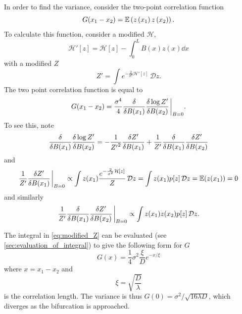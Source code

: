 In order to find the variance, consider the two-point correlation function
\begin{equation}
  \label{eq:two_point_corr}
  G(x_1 - x_2) = \operatorname*{\mathbb{E}} \left(z\left(x_1\right)z\left(x_2\right)\right).
\end{equation}
To calculate this function, consider a modified $\mathcal{H}$,
\begin{equation}
  \label{eq:modified_H}
  \mathcal{H}'[z] = \mathcal{H}[z] - \int_0^L B(x) z(x) \dd{x}
\end{equation}
with a modified $Z$
\begin{equation}
  \label{eq:modified_Z}
  Z' = \int e^{-\frac{2}{\sigma^2} \mathcal{H}'[z]}\,\mathcal{D}z.
\end{equation}
The two point correlation function is equal \parencite{Goldenfeld1992} to
\begin{equation}
  \label{eq:two_point_from_partition}
  G(x_1-x_2) = \frac{\sigma^4}{4}\fdv{B(x_1)}\fdv{\log Z'}{B(x_2)} \eval_{B=0}.
\end{equation}
To see this, note
\begin{equation}
  \label{eq:log_deriv}
  \fdv{B(x_1)}\fdv{\log Z'}{B(x_2)} =  -\frac{1}{{Z'}^2}\fdv{Z'}{B(x_1)} + \frac{1}{Z'}\fdv{B(x_1)}\fdv{Z'}{B(x_2)}
\end{equation}
and
\begin{equation}
  \label{eq:log_deriv_first}
  \frac{1}{Z'}\fdv{Z'}{B(x_1)}\eval_{B=0} \propto \int z(x_1) \frac{e^{-\frac{2}{\sigma^2} \mathcal{H}[z]}}{Z}\,\mathcal{D}z = \int z(x_1) p[z] \,\mathcal{D}z = \E(z(x_1)) = 0
\end{equation}
and similarly
\begin{equation}
  \label{eq:log_deriv_second}
  \frac{1}{Z'}\fdv{B(x_1)}\fdv{Z'}{B(x_2)}\eval_{B=0} \propto \int z(x_1)z(x_2) p[z]\,\mathcal{D}z .
\end{equation}

The integral in \cref{eq:modified_Z} can be evaluated (see \cref{sec:evaluation_of_integral}) to give the following form for $G$
\begin{equation}
  \label{eq:two_point_correlation_actual}
  G(x) = \frac{1}{4} \sigma^2 \frac{\xi}{D} e^{-x/\xi}
\end{equation}
where $x = x_1 - x_2$ and
\begin{equation}
  \label{eq:corr_len}
  \xi = \sqrt{\frac{D}{\lambda}}
\end{equation}
is the correlation length. The variance is thus $G(0) = \sigma^2/\sqrt{16\lambda D}$, which diverges as the bifurcation is approached.

